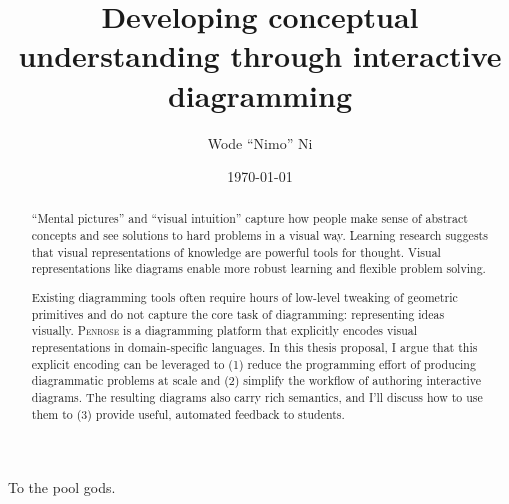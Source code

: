 \documentclass[12pt]{cmuthesis}
\newcommand*{\Penrose}{\textsc{Penrose}\xspace}
\begin{document}
 
\frontmatter

\pagestyle{empty}

\title{ 
{\bf Developing conceptual understanding through interactive diagramming}}

\author{Wode ``Nimo'' Ni}
\date{\today}





\maketitle

\begin{dedication}
To the pool gods.
\end{dedication}

\pagestyle{plain} %

\begin{abstract}
``Mental pictures'' and ``visual intuition'' capture how people make sense of abstract concepts and see solutions to hard problems in a visual way. Learning research suggests that visual representations of knowledge are powerful tools for thought. Visual representations like diagrams enable more robust learning and flexible problem solving. 

Existing diagramming tools often require hours of low-level tweaking of geometric primitives and do not capture the core task of diagramming: representing ideas visually. \Penrose is a diagramming platform that explicitly encodes visual representations in domain-specific languages. In this thesis proposal, I argue that this explicit encoding can be leveraged to (1) reduce the programming effort of producing diagrammatic problems at scale and (2) simplify the workflow of authoring interactive diagrams. The resulting diagrams also carry rich semantics, and I'll discuss how to use them to (3) provide useful, automated feedback to students. 


\end{abstract}
\end{document}
